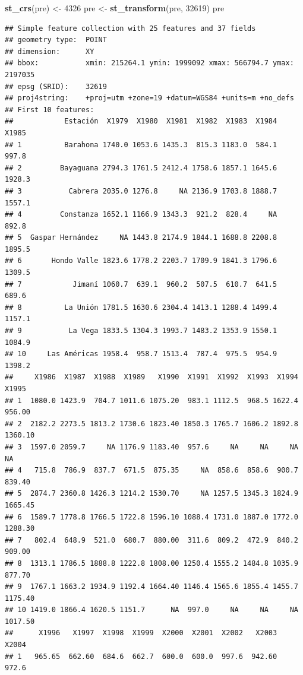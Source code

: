 \documentclass[11pt,]{article}
\newenvironment{Shaded}{\begin{snugshade}}{\end{snugshade}}
\newcommand{\KeywordTok}[1]{\textcolor[rgb]{0.13,0.29,0.53}{\textbf{#1}}}
\newcommand{\DecValTok}[1]{\textcolor[rgb]{0.00,0.00,0.81}{#1}}
\newcommand{\StringTok}[1]{\textcolor[rgb]{0.31,0.60,0.02}{#1}}
\newcommand{\NormalTok}[1]{#1}
\begin{document}
\begin{Shaded}
\begin{Highlighting}[]
\KeywordTok{st_crs}\NormalTok{(pre) <-}\StringTok{ }\DecValTok{4326}
\NormalTok{pre <-}\StringTok{ }\KeywordTok{st_transform}\NormalTok{(pre, }\DecValTok{32619}\NormalTok{)}
\NormalTok{pre}
\end{Highlighting}
\end{Shaded}

\begin{verbatim}
## Simple feature collection with 25 features and 37 fields
## geometry type:  POINT
## dimension:      XY
## bbox:           xmin: 215264.1 ymin: 1999092 xmax: 566794.7 ymax: 2197035
## epsg (SRID):    32619
## proj4string:    +proj=utm +zone=19 +datum=WGS84 +units=m +no_defs
## First 10 features:
##            Estación  X1979  X1980  X1981  X1982  X1983  X1984  X1985
## 1          Barahona 1740.0 1053.6 1435.3  815.3 1183.0  584.1  997.8
## 2         Bayaguana 2794.3 1761.5 2412.4 1758.6 1857.1 1645.6 1928.3
## 3           Cabrera 2035.0 1276.8     NA 2136.9 1703.8 1888.7 1557.1
## 4         Constanza 1652.1 1166.9 1343.3  921.2  828.4     NA  892.8
## 5  Gaspar Hernández     NA 1443.8 2174.9 1844.1 1688.8 2208.8 1895.5
## 6       Hondo Valle 1823.6 1778.2 2203.7 1709.9 1841.3 1796.6 1309.5
## 7            Jimaní 1060.7  639.1  960.2  507.5  610.7  641.5  689.6
## 8          La Unión 1781.5 1630.6 2304.4 1413.1 1288.4 1499.4 1157.1
## 9           La Vega 1833.5 1304.3 1993.7 1483.2 1353.9 1550.1 1084.9
## 10     Las Américas 1958.4  958.7 1513.4  787.4  975.5  954.9 1398.2
##     X1986  X1987  X1988  X1989   X1990  X1991  X1992  X1993  X1994   X1995
## 1  1080.0 1423.9  704.7 1011.6 1075.20  983.1 1112.5  968.5 1622.4  956.00
## 2  2182.2 2273.5 1813.2 1730.6 1823.40 1850.3 1765.7 1606.2 1892.8 1360.10
## 3  1597.0 2059.7     NA 1176.9 1183.40  957.6     NA     NA     NA      NA
## 4   715.8  786.9  837.7  671.5  875.35     NA  858.6  858.6  900.7  839.40
## 5  2874.7 2360.8 1426.3 1214.2 1530.70     NA 1257.5 1345.3 1824.9 1665.45
## 6  1589.7 1778.8 1766.5 1722.8 1596.10 1088.4 1731.0 1887.0 1772.0 1288.30
## 7   802.4  648.9  521.0  680.7  880.00  311.6  809.2  472.9  840.2  909.00
## 8  1313.1 1786.5 1888.8 1222.8 1808.00 1250.4 1555.2 1484.8 1035.9  877.70
## 9  1767.1 1663.2 1934.9 1192.4 1664.40 1146.4 1565.6 1855.4 1455.7 1175.40
## 10 1419.0 1866.4 1620.5 1151.7      NA  997.0     NA     NA     NA 1017.50
##      X1996   X1997  X1998  X1999  X2000  X2001  X2002   X2003  X2004
## 1   965.65  662.60  684.6  662.7  600.0  600.0  997.6  942.60  972.6

\end{verbatim}
\end{document}

